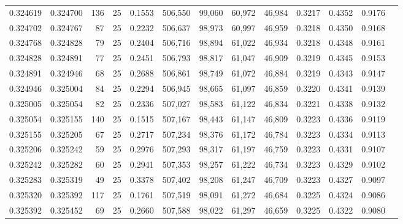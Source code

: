 \begin{tabular}{rrrrrrrrrrrrr}
0.324619 & 0.324700 &   136 &  25 &                                     0.1553 & 506,550 &  99,060 &  60,972 &  46,984 & 0.3217 & 0.4352 & 0.9176 \\
0.324702 & 0.324767 &    87 &  25 &                                     0.2232 & 506,637 &  98,973 &  60,997 &  46,959 & 0.3218 & 0.4350 & 0.9168 \\
0.324768 & 0.324828 &    79 &  25 &                                     0.2404 & 506,716 &  98,894 &  61,022 &  46,934 & 0.3218 & 0.4348 & 0.9161 \\
0.324828 & 0.324891 &    77 &  25 &                                     0.2451 & 506,793 &  98,817 &  61,047 &  46,909 & 0.3219 & 0.4345 & 0.9153 \\
0.324891 & 0.324946 &    68 &  25 &                                     0.2688 & 506,861 &  98,749 &  61,072 &  46,884 & 0.3219 & 0.4343 & 0.9147 \\
0.324946 & 0.325004 &    84 &  25 &                                     0.2294 & 506,945 &  98,665 &  61,097 &  46,859 & 0.3220 & 0.4341 & 0.9139 \\
0.325005 & 0.325054 &    82 &  25 &                                     0.2336 & 507,027 &  98,583 &  61,122 &  46,834 & 0.3221 & 0.4338 & 0.9132 \\
0.325054 & 0.325155 &   140 &  25 &                                     0.1515 & 507,167 &  98,443 &  61,147 &  46,809 & 0.3223 & 0.4336 & 0.9119 \\
0.325155 & 0.325205 &    67 &  25 &                                     0.2717 & 507,234 &  98,376 &  61,172 &  46,784 & 0.3223 & 0.4334 & 0.9113 \\
0.325206 & 0.325242 &    59 &  25 &                                     0.2976 & 507,293 &  98,317 &  61,197 &  46,759 & 0.3223 & 0.4331 & 0.9107 \\
0.325242 & 0.325282 &    60 &  25 &                                     0.2941 & 507,353 &  98,257 &  61,222 &  46,734 & 0.3223 & 0.4329 & 0.9102 \\
0.325283 & 0.325319 &    49 &  25 &                                     0.3378 & 507,402 &  98,208 &  61,247 &  46,709 & 0.3223 & 0.4327 & 0.9097 \\
0.325320 & 0.325392 &   117 &  25 &                                     0.1761 & 507,519 &  98,091 &  61,272 &  46,684 & 0.3225 & 0.4324 & 0.9086 \\
0.325392 & 0.325452 &    69 &  25 &                                     0.2660 & 507,588 &  98,022 &  61,297 &  46,659 & 0.3225 & 0.4322 & 0.9080 \\

\end{tabular}

